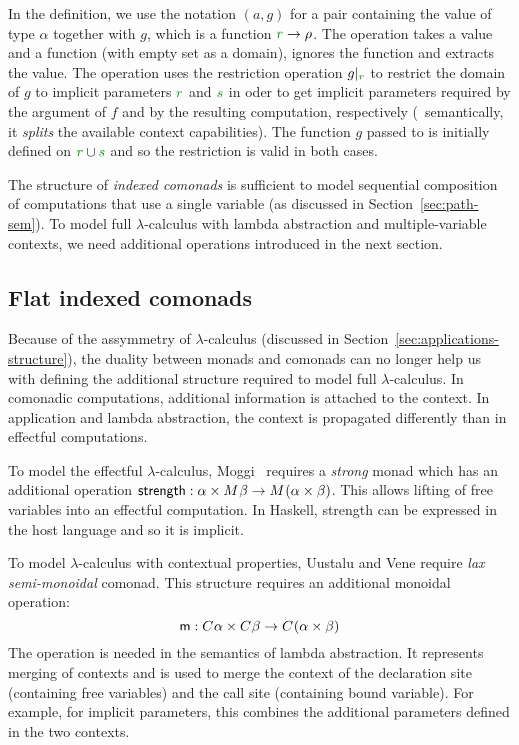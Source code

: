 \noindent
In the definition, we use the notation $(a, g)$ for a pair containing the value of type $\alpha$
together with $g$, which is a function $\cclrd{r} \rightarrow \rho$. The  operation
takes a value and a function (with empty set as a domain), ignores the function and extracts the
value. The  operation uses the restriction operation $\restr{g}{\cclrd{r}}$ to 
restrict the domain of $g$ to implicit parameters $\cclrd{r}$ and $\cclrd{s}$ in oder to get
implicit parameters required by the argument of $f$ and by the resulting computation, respectively
(\ie~semantically, it \emph{splits} the available context capabilities). The function $g$ passed 
to  is initially defined on $\cclrd{r} \cup \cclrd{s}$ and so the restriction is 
valid in both cases.

The structure of \emph{indexed comonads} is sufficient to model sequential composition of 
computations that use a single variable (as discussed in Section~\ref{sec:path-sem}). To model 
full $\lambda$-calculus with lambda abstraction and multiple-variable contexts, we need 
additional operations introduced in the next section.


\subsection{Flat indexed comonads}
\label{sec:flat-semantics-monoidal}

Because of the assymmetry of $\lambda$-calculus (discussed in Section~\ref{sec:applications-structure}),
the duality between monads and comonads can no longer help us with defining the additional structure
required to model full $\lambda$-calculus. In comonadic computations, additional information is attached
to the context. In application and lambda abstraction, the context is propagated differently than 
in effectful computations.

To model the effectful $\lambda$-calculus, Moggi~\cite{monad-notions} requires a \emph{strong} monad which
has an additional operation $\textnormal{\sffamily strength} : \alpha\times M^{}\beta \rightarrow M^{}(\alpha\times\beta)$.
This allows lifting of free variables into an effectful computation. In Haskell, strength can be expressed
in the host language and so it is implicit.

To model $\lambda$-calculus with contextual properties, Uustalu and Vene \cite{comonads-notions} 
require \emph{lax semi-monoidal} comonad. This structure requires an additional monoidal operation:
%
\begin{equation*}
\textnormal{\sffamily m} : C^{}\alpha \times C^{}\beta \rightarrow C^{}(\alpha \times \beta)
\end{equation*}
%
The  operation is needed in the semantics of lambda abstraction. It represents merging of 
contexts and is used to merge the context of the declaration site (containing free variables)
and the call site (containing bound variable). For example, for implicit parameters, this combines
the additional parameters defined in the two contexts.

